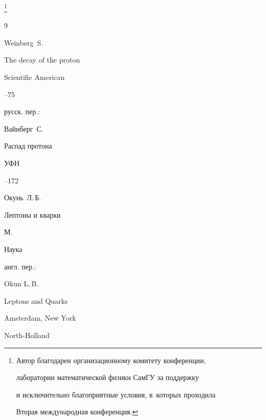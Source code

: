 \thanks{Автор благодарен организационному комитету конференции,

 лаборатории  математической физики СамГУ  за поддержку

 и исключительно благоприятные условия, в~которых проходила

 Вторая международная конференция.}





\begin{thebibliography}{9}




\by Weinberg~S.

\paper The decay of the proton

\jour Scientific American



--75


\rtransl русск. пер.:~

\by Вайнберг~С.

\paper  Распад протона

\jour УФН




--172


\moreref




\by Окунь~Л.\,Б.

\book Лептоны и кварки

\publaddr М.

\publ Наука



\transl англ. пер.:~

\by Okun L.\,B.

\book Leptons and Quarks 

\publaddr Amsterdam, New York 

\publ North-Holland








\end{thebibliography}
